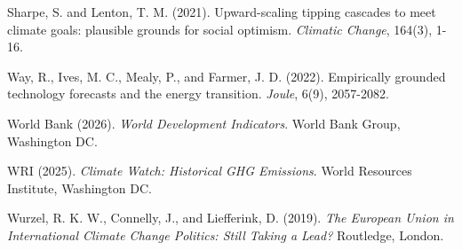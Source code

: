 \documentclass[10pt,a4paper]{article}
\begin{document}
\begin{list}{}{\setlength\leftmargin{1.5em}\setlength\itemindent{-1.5em}\setlength\itemsep{0.4em}}
\item Sharpe, S. and Lenton, T. M. (2021). Upward-scaling tipping cascades to meet climate goals:
plausible grounds for social optimism. \textit{Climatic Change}, 164(3), 1-16.

\item Way, R., Ives, M. C., Mealy, P., and Farmer, J. D. (2022). Empirically grounded technology
forecasts and the energy transition. \textit{Joule}, 6(9), 2057-2082.

\item World Bank (2026). \textit{World Development Indicators}. World Bank Group, Washington DC.

\item WRI (2025). \textit{Climate Watch: Historical GHG Emissions}. World Resources Institute,
Washington DC.

\item Wurzel, R. K. W., Connelly, J., and Liefferink, D. (2019). \textit{The European Union in International
Climate Change Politics: Still Taking a Lead?} Routledge, London.

\end{list}
\end{document}
